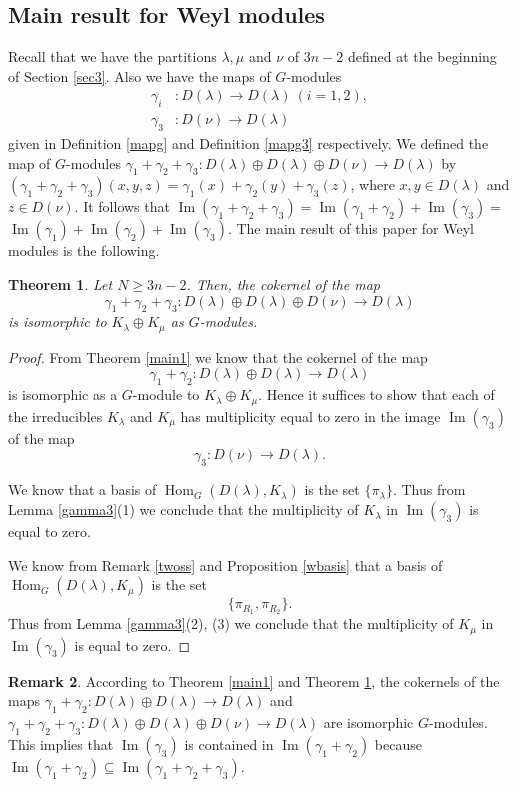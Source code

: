 \documentclass[11pt]{amsart}
\newtheorem{thm}{Theorem}[section]
\theoremstyle{definition}
\newtheorem{rem}[thm]{Remark}
\numberwithin{equation}{section}
\DeclareMathOperator{\Ima}{Im}
\DeclareMathOperator{\Hom}{Hom}
\begin{document}
\subsection{Main result for Weyl modules} Recall that we have the partitions $\lambda, \mu$ and $\nu $ of $3n-2$ defined at the beginning of Section \ref{sec3}. Also we have the maps of $G$-modules \begin{align*}\gamma_i&: D(\lambda) \to D(\lambda) \ (i=1,2), \\ \gamma_3&: D(\nu) \to D(\lambda)\end{align*}
given in Definition \ref{mapg} and Definition \ref{mapg3} respectively. We defined the map of $G$-modules $\gamma_1 + \gamma_2 + \gamma_3 : D(\lambda) \oplus D(\lambda) \oplus D(\nu) \to D(\lambda)$ by $(\gamma_1 + \gamma_2 + \gamma_3) (x,y,z) = \gamma_1(x) + \gamma_2(y) + \gamma_3(z)$, where $x,y \in D(\lambda)$  and $z \in D(\nu)$. It follows that $\Ima (\gamma_1 + \gamma_2 + \gamma_3)= \Ima(\gamma_1 + \gamma_2)+ \Ima(\gamma_3)=$$\Ima(\gamma_1) + \Ima(\gamma_2)+ \Ima(\gamma_3)$. The main result of this paper for Weyl modules is the following.
\begin{thm}\label{main2}
	Let $N \ge 3n-2$. Then, the cokernel of the map \[\gamma_1 + \gamma_2 + \gamma_3 : D(\lambda) \oplus D(\lambda) \oplus D(\nu) \to D(\lambda) \] is isomorphic to $K_{\lambda} \oplus K_{\mu}$ as $G$-modules.
\end{thm}
\begin{proof} From Theorem \ref{main1} we know that the cokernel of the map \[ \gamma_1 + \gamma_2: D(\lambda) \oplus D(\lambda) \to D(\lambda) \]
	is isomorphic as a $G$-module to $K_\lambda \oplus K_\mu$. Hence it suffices to show that each of the irreducibles $K_{\lambda}$ and $K_{\mu}$ has multiplicity equal to zero in the image $\Ima (\gamma_3)$ of the map \[\gamma_3 : D(\nu) \to D(\lambda). \]
	
	We know that a basis of $\Hom_G(D(\lambda), K_\lambda)$ is the set $\{ \pi_\lambda\}.$ Thus from Lemma \ref{gamma3}(1) we conclude that the multiplicity of $K_\lambda$ in $\Ima(\gamma_3)$ is equal to zero.
	
	We know from Remark \ref{twoss} and Proposition \ref{wbasis} that a basis of $\Hom_G(D(\lambda), K_\mu)$ is the set \[\{ \pi_{R_1}, \pi_{R_2}\}.\]
	Thus from Lemma \ref{gamma3}(2), (3) we conclude that the multiplicity of $K_\mu$ in $\Ima(\gamma_3)$ is equal to zero.
\end{proof}
\begin{rem}\label{rem46}According to Theorem \ref{main1} and Theorem \ref{main2}, the cokernels of the maps $\gamma_1 + \gamma_2 : D(\lambda) \oplus D(\lambda) \to D(\lambda)$ and $\gamma_1 + \gamma_2 + \gamma_3 : D(\lambda) \oplus D(\lambda) \oplus D(\nu) \to D(\lambda)$ are isomorphic $G$-modules. This implies that $\Ima(\gamma_3)$ is contained in $\Ima(\gamma_1+\gamma_2)$ because $\Ima(\gamma_1+\gamma_2) \subseteq \Ima(\gamma_1+\gamma_2+\gamma_3)$.
	\end{rem}
\end{document}
